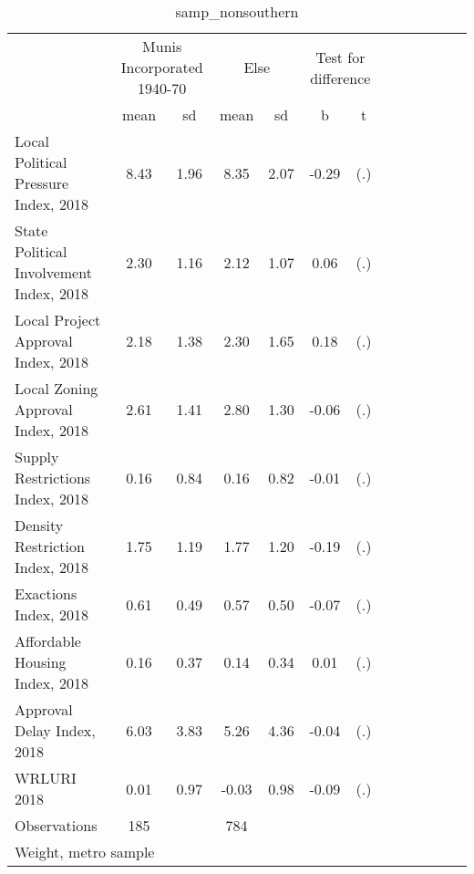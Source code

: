 \begin{table}[htbp]\centering
\def\sym#1{\ifmmode^{#1}\else\(^{#1}\)\fi}
\caption{samp\_nonsouthern \label{tab1}}
\begin{tabular}{l*{3}{cccc}}
\toprule
                    &\multicolumn{2}{c}{Munis Incorporated 1940-70}&\multicolumn{2}{c}{Else} &\multicolumn{2}{c}{Test for difference}\\
                    &        mean&          sd&        mean&          sd&           b         &           t\\
\midrule
Local Political Pressure Index, 2018&        8.43&        1.96&        8.35&        2.07&       -0.29         &         (.)\\
State Political Involvement Index, 2018&        2.30&        1.16&        2.12&        1.07&        0.06         &         (.)\\
Local Project Approval Index, 2018&        2.18&        1.38&        2.30&        1.65&        0.18         &         (.)\\
Local Zoning Approval Index, 2018&        2.61&        1.41&        2.80&        1.30&       -0.06         &         (.)\\
Supply Restrictions Index, 2018&        0.16&        0.84&        0.16&        0.82&       -0.01         &         (.)\\
Density Restriction Index, 2018&        1.75&        1.19&        1.77&        1.20&       -0.19         &         (.)\\
Exactions Index, 2018&        0.61&        0.49&        0.57&        0.50&       -0.07         &         (.)\\
Affordable Housing Index, 2018&        0.16&        0.37&        0.14&        0.34&        0.01         &         (.)\\
Approval Delay Index, 2018&        6.03&        3.83&        5.26&        4.36&       -0.04         &         (.)\\
WRLURI 2018         &        0.01&        0.97&       -0.03&        0.98&       -0.09         &         (.)\\
\midrule
Observations        &         185&            &         784&            &                     &            \\
\bottomrule
\multicolumn{7}{l}{\footnotesize Weight, metro sample}\\
\end{tabular}
\end{table}
